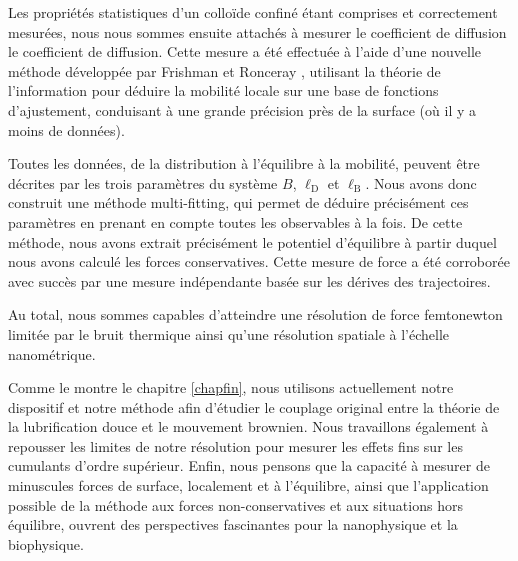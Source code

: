 Les propriétés statistiques d'un colloïde confiné étant comprises et correctement mesurées, nous nous sommes ensuite attachés à mesurer le coefficient de diffusion le coefficient de diffusion. Cette mesure a été effectuée à l'aide d'une nouvelle méthode développée par Frishman et Ronceray \cite{frishman_learning_2020}, utilisant la théorie de l'information pour déduire la mobilité locale sur une base de fonctions d'ajustement, conduisant à une grande précision près de la surface (où il y a moins de données). 

Toutes les données, de la distribution à l'équilibre à la mobilité, peuvent être décrites par les trois paramètres du système $B$, $\ell _\mathrm{D}$ et $\ell_\mathrm{B}$. Nous avons donc construit une méthode multi-fitting, qui permet de déduire précisément ces paramètres en prenant en compte toutes les observables à la fois. De cette méthode, nous avons extrait précisément le potentiel d'équilibre à partir duquel nous avons calculé les forces conservatives. Cette mesure de force a été corroborée avec succès par une mesure indépendante basée sur les dérives des trajectoires.

Au total, nous sommes capables d'atteindre une résolution de force femtonewton limitée par le bruit thermique ainsi qu'une résolution spatiale à l'échelle nanométrique.

Comme le montre le chapitre \ref{chapfin}, nous utilisons actuellement notre dispositif et notre méthode afin d'étudier le couplage original entre la théorie de la lubrification douce et le mouvement brownien. Nous travaillons également à repousser les limites de notre résolution pour mesurer les effets fins sur les cumulants d'ordre supérieur. Enfin, nous pensons que la capacité à mesurer de minuscules forces de surface, localement et à l'équilibre, ainsi que l'application possible de la méthode aux forces non-conservatives et aux situations hors équilibre, ouvrent des perspectives fascinantes pour la nanophysique et la biophysique.


